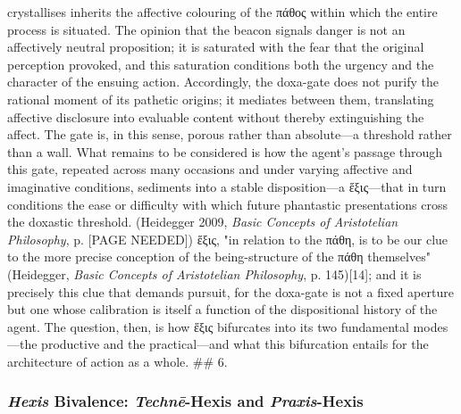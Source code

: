 \documentclass{article}
\begin{document}
crystallises inherits the affective colouring of the πάθος within which the entire process is situated. The opinion that the beacon signals danger is not an affectively neutral proposition; it is saturated with the fear that the original perception provoked, and this saturation conditions both the urgency and the character of the ensuing action. Accordingly, the doxa-gate does not purify the rational moment of its pathetic origins; it mediates between them, translating affective disclosure into evaluable content without thereby extinguishing the affect. The gate is, in this sense, porous rather than absolute—a threshold rather than a wall. What remains to be considered is how the agent's passage through this gate, repeated across many occasions and under varying affective and imaginative conditions, sediments into a stable disposition—a ἕξις—that in turn conditions the ease or difficulty with which future phantastic presentations cross the doxastic threshold. (Heidegger 2009, \textit{Basic Concepts of Aristotelian Philosophy}, p. [PAGE NEEDED]) ἕξις, "in relation to the πάθη, is to be our clue to the more precise conception of the being-structure of the πάθη themselves" (Heidegger, \textit{Basic Concepts of Aristotelian Philosophy}, p. 145)[14]; and it is precisely this clue that demands pursuit, for the doxa-gate is not a fixed aperture but one whose calibration is itself a function of the dispositional history of the agent. The question, then, is how ἕξις bifurcates into its two fundamental modes—the productive and the practical—and what this bifurcation entails for the architecture of action as a whole. ## 6. 

\subsubsection*{\textit{Hexis} Bivalence: \textit{Technē}-Hexis and \textit{Praxis}-Hexis}
\end{document}
